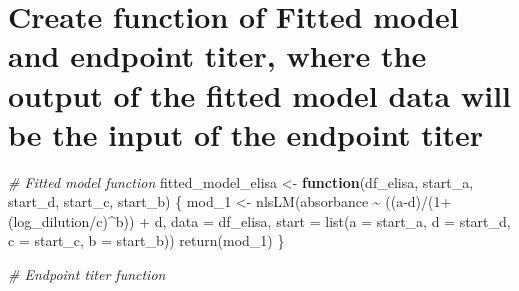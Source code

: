 \documentclass[
]{book}
\newenvironment{Shaded}{\begin{snugshade}}{\end{snugshade}}
\newcommand{\AttributeTok}[1]{\textcolor[rgb]{0.77,0.63,0.00}{#1}}
\newcommand{\CommentTok}[1]{\textcolor[rgb]{0.56,0.35,0.01}{\textit{#1}}}
\newcommand{\ControlFlowTok}[1]{\textcolor[rgb]{0.13,0.29,0.53}{\textbf{#1}}}
\newcommand{\DecValTok}[1]{\textcolor[rgb]{0.00,0.00,0.81}{#1}}
\newcommand{\FunctionTok}[1]{\textcolor[rgb]{0.00,0.00,0.00}{#1}}
\newcommand{\NormalTok}[1]{#1}
\newcommand{\OtherTok}[1]{\textcolor[rgb]{0.56,0.35,0.01}{#1}}
\newcommand{\SpecialCharTok}[1]{\textcolor[rgb]{0.00,0.00,0.00}{#1}}
\begin{document}
\hypertarget{create-function-of-fitted-model-and-endpoint-titer-where-the-output-of-the-fitted-model-data-will-be-the-input-of-the-endpoint-titer}{%
\section{Create function of Fitted model and endpoint titer, where the output of the fitted model data will be the input of the endpoint titer}\label{create-function-of-fitted-model-and-endpoint-titer-where-the-output-of-the-fitted-model-data-will-be-the-input-of-the-endpoint-titer}}

\begin{Shaded}
\begin{Highlighting}[]
\CommentTok{\# Fitted model function}
\NormalTok{fitted\_model\_elisa }\OtherTok{\textless{}{-}} \ControlFlowTok{function}\NormalTok{(df\_elisa, }
\NormalTok{                               start\_a, }
\NormalTok{                               start\_d, }
\NormalTok{                               start\_c, }
\NormalTok{                               start\_b) \{}
\NormalTok{  mod\_1 }\OtherTok{\textless{}{-}} \FunctionTok{nlsLM}\NormalTok{(absorbance }\SpecialCharTok{\textasciitilde{}} 
\NormalTok{                   ((a}\SpecialCharTok{{-}}\NormalTok{d)}\SpecialCharTok{/}\NormalTok{(}\DecValTok{1}\SpecialCharTok{+}\NormalTok{(log\_dilution}\SpecialCharTok{/}\NormalTok{c)}\SpecialCharTok{\^{}}\NormalTok{b)) }\SpecialCharTok{+}\NormalTok{ d,}
\AttributeTok{data =}\NormalTok{ df\_elisa,}
\AttributeTok{start =} \FunctionTok{list}\NormalTok{(}\AttributeTok{a =}\NormalTok{ start\_a, }\AttributeTok{d =}\NormalTok{ start\_d, }\AttributeTok{c =}\NormalTok{ start\_c, }\AttributeTok{b =}\NormalTok{ start\_b))}
  \FunctionTok{return}\NormalTok{(mod\_1)}
\NormalTok{\}}

\CommentTok{\# Endpoint titer function}


\end{Highlighting}
\end{Shaded}
\end{document}
